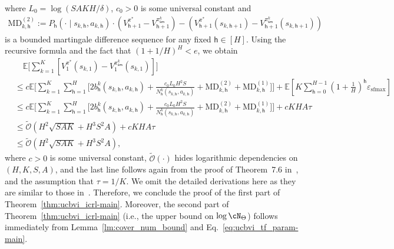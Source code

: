 \documentclass[10pt]{article}
\newcommand{\eps}{\varepsilon}
\newcommand{\<}{\left\langle}
\renewcommand{\>}{\right\rangle}
\newcommand{\E}{\mathbb{E}}
\newcommand{\temp}{{\tau}}
\newcommand{\tcO}{{\tilde{\mathcal O}}}
\newcommand{\state}{{s}}
\newcommand{\action}{{a}}
\newcommand{\plc}{{\pi}}
\newcommand{\optplc}{{\pi^*}}
\newcommand{\Numepi}{{K}}
\newcommand{\horizon}{{H}}
\renewcommand{\horizon}{{H}}
\newcommand{\transit}{{P}}
\newcommand{\bonus}{{b}}
\newcommand{\valuefun}{{V}}
\newcommand{\tfparspace}{{\Theta}}
\newcommand{\Numst}{{S}}
\newcommand{\Numact}{{A}}
\newcommand{\Numvi}{{N}}
\newcommand{\Vfun}{{\valuefun}}
\newcommand{\s}{{\mathsf{sm}}}
\newcommand{\epstemp}{{\eps_{\mathrm{sfmax}}}}
\newcommand{\MD}{{\mathrm{MD}}}
\def\sh{{\mathsf{h}}}
\begin{document}
where $L_0=\log(\Numst\Numact\Numepi\horizon/\delta)$,  $c_0>0$ is some universal constant and
\begin{align*}
 \MD^{(2)}_{k,\sh}:=\transit_\sh(\cdot\mid\state_{k,\sh},\action_{k,\sh})\cdot(\Vfun_{\sh+1}^\optplc-\Vfun_{\sh+1}^{\plc^k_\s})-  (\Vfun_{\sh+1}^\optplc(\state_{k,\sh+  1})-\Vfun_{\sh+1}^{\plc^k_\s}(\state_{k,\sh+  1}))
\end{align*} is a bounded martingale difference sequence for any fixed $\sh\in[\horizon]$. Using the recursive formula and the fact that $(1+1/\horizon)^\horizon<e$, we obtain
\begin{align*}
 &\quad \E\Big[ \sum_{k=1}^\Numepi [\Vfun_1^{\optplc}(\state_{k,1})-\Vfun_1^{\plc^k_{\s}}(\state_{k,1})
 ]  \Big]\\
 &\leq c\E\Bigg[\sum_{k=1}^\Numepi\sum_{\sh=1}^\horizon\Big[2\bonus_\sh^k(\state_{k,\sh},\action_{k,\sh})
+
\frac{c_0L_0\horizon^2\Numst}{\Numvi^k_\sh(\state_{k,\sh},\action_{k,\sh})}+\MD^{(2)}_{k,\sh}+\MD^{(1)}_{k,\sh}\Big]\Bigg]+\E[\Numepi\sum_{\sh=0}^{\horizon-1}(1+\frac{1}\horizon)^\sh\epstemp]\\
&\leq c\E\Bigg[\sum_{k=1}^\Numepi\sum_{\sh=1}^\horizon\Big[2\bonus_\sh^k(\state_{k,\sh},\action_{k,\sh})
+
\frac{c_0L_0\horizon^2\Numst}{\Numvi^k_\sh(\state_{k,\sh},\action_{k,\sh})}+\MD^{(2)}_{k,\sh}+\MD^{(1)}_{k,\sh}\Big]\Bigg]+c\Numepi\horizon\Numact\temp\\
&\leq
\tcO (\horizon^2\sqrt{\Numst\Numact\Numepi}+\horizon^3\Numst^2\Numact)+c\Numepi\horizon\Numact\temp\\
&\leq \tcO(\horizon^2\sqrt{\Numst\Numact\Numepi}+\horizon^3\Numst^2\Numact),
\end{align*} where $c>0$ is some universal constant,  $\tcO(\cdot)$ hides logarithmic dependencies on $(\horizon,\Numepi,\Numst,\Numact)$, and the last line follows again from the proof of Theorem~7.6 in~\cite{agarwal2019reinforcement}, and the assumption that $\temp=1/\Numepi$.
 We omit the detailed derivations here as they are similar to those in~\cite{azar2017minimax,agarwal2019reinforcement}. Therefore, we conclude the proof of the first part of Theorem~\ref{thm:ucbvi_icrl-main}. Moreover,  the second part of Theorem~\ref{thm:ucbvi_icrl-main} (i.e., the upper bound on $\log\cN_{\tfparspace}$) follows immediately from Lemma~\ref{lm:cover_num_bound} and Eq.~\eqref{eq:ucbvi_tf_param-main}.
\end{document}
